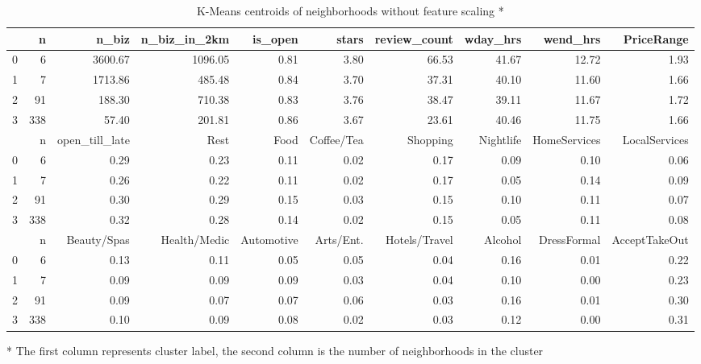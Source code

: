 \documentclass[compsoc]{IEEEtran}
\let\MYoriglatexcaption\caption
\renewcommand{\caption}[2][\relax]{\MYoriglatexcaption[#2]{#2}}
\begin{document}
\begin{table}[htbp]
\caption{K-Means centroids of neighborhoods without feature scaling *}
\label{nbh-centroids}

\begin{tabular}{lrrrrrrrrr}
\toprule
{} &    n &    n\_biz &  n\_biz\_in\_2km &  is\_open &  stars &  review\_count &  wday\_hrs &  wend\_hrs &  PriceRange \\
\midrule
0 &    6 &  3600.67 &       1096.05 &     0.81 &   3.80 &         66.53 &     41.67 &     12.72 &        1.93 \\
1 &    7 &  1713.86 &        485.48 &     0.84 &   3.70 &         37.31 &     40.10 &     11.60 &        1.66 \\
2 &   91 &   188.30 &        710.38 &     0.83 &   3.76 &         38.47 &     39.11 &     11.67 &        1.72 \\
3 &  338 &    57.40 &        201.81 &     0.86 &   3.67 &         23.61 &     40.46 &     11.75 &        1.66 \\
\midrule
{} &    n &  open\_till\_late &  Rest &  Food &  Coffee/Tea &  Shopping &  Nightlife &  HomeServices &  LocalServices \\
\midrule
0 &    6 &            0.29 &  0.23 &  0.11 &        0.02 &      0.17 &       0.09 &          0.10 &           0.06 \\
1 &    7 &            0.26 &  0.22 &  0.11 &        0.02 &      0.17 &       0.05 &          0.14 &           0.09 \\
2 &   91 &            0.30 &  0.29 &  0.15 &        0.03 &      0.15 &       0.10 &          0.11 &           0.07 \\
3 &  338 &            0.32 &  0.28 &  0.14 &        0.02 &      0.15 &       0.05 &          0.11 &           0.08 \\
\midrule
{} &    n &  Beauty/Spas &  Health/Medic &  Automotive &  Arts/Ent. &  Hotels/Travel &  Alcohol &  DressFormal &  AcceptTakeOut \\
\midrule
0 &    6 &         0.13 &          0.11 &        0.05 &       0.05 &           0.04 &     0.16 &         0.01 &           0.22 \\
1 &    7 &         0.09 &          0.09 &        0.09 &       0.03 &           0.04 &     0.10 &         0.00 &           0.23 \\
2 &   91 &         0.09 &          0.07 &        0.07 &       0.06 &           0.03 &     0.16 &         0.01 &           0.30 \\
3 &  338 &         0.10 &          0.09 &        0.08 &       0.02 &           0.03 &     0.12 &         0.00 &           0.31 \\
\bottomrule
\end{tabular}

\vspace{1em}
\small{* The first column represents cluster label, the second column is the number of neighborhoods in the cluster}

\end{table}
\end{document}
